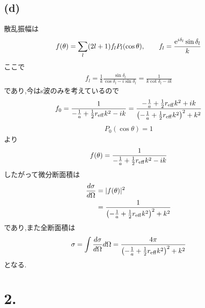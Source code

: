 \documentclass[uplatex,a4j,11pt,dvipdfmx]{jsarticle}
\begin{document}
\subsection*{(d)}
散乱振幅は
\begin{align*}
  f(\theta)=\sum_l(2l+1)f_lP_l(\cos\theta),\qquad f_l=\frac{{\rm e}^{i\delta_l}\sin\delta_l}{k}
\end{align*}
ここで
\begin{align*}
  f_l=\frac{1}{k}\frac{\sin\delta_l}{\cos\delta_l-i\sin\delta_l}=\frac{1}{k\cot\delta_l-ik}
\end{align*}
であり,今はs波のみを考えているので
\begin{align*}
  f_0=\frac{1}{-\frac{1}{a}+\frac{1}{2}r_{\rm eff}k^2-ik}=\frac{-\frac{1}{a}+\frac{1}{2}r_{\rm eff}k^2+ik}{\left(-\frac{1}{a}+\frac{1}{2}r_{\rm eff}k^2\right)^2+k^2}
\end{align*}
\begin{align*}
  P_0(\cos\theta)=1
\end{align*}
より
\begin{align}
  f(\theta)=\frac{1}{-\frac{1}{a}+\frac{1}{2}r_{\rm eff}k^2-ik}
\end{align}
したがって微分断面積は
\begin{align}
  \begin{split}
  \frac{d\sigma}{d\Omega}&=|f(\theta)|^2\\
  &=\frac{1}{\left(-\frac{1}{a}+\frac{1}{2}r_{\rm eff}k^2\right)^2+k^2}
  \end{split}
\end{align}
であり,また全断面積は
\begin{align}
  \sigma=\int\frac{d\sigma}{d\Omega}d\Omega=\frac{4\pi}{\left(-\frac{1}{a}+\frac{1}{2}r_{\rm eff}k^2\right)^2+k^2}
\end{align}
となる.
\section*{2.}
\end{document}
